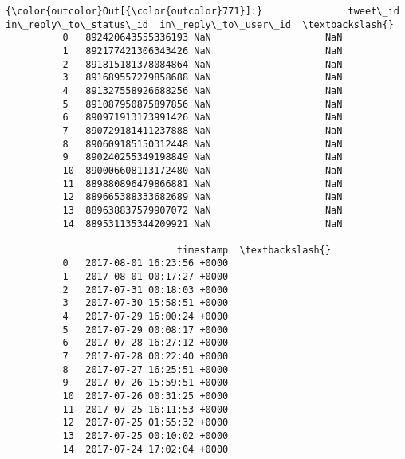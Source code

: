 \documentclass[11pt]{article}
\begin{document}
\begin{Verbatim}[commandchars=\\\{\}]
{\color{outcolor}Out[{\color{outcolor}771}]:}               tweet\_id  in\_reply\_to\_status\_id  in\_reply\_to\_user\_id  \textbackslash{}
          0   892420643555336193 NaN                    NaN                    
          1   892177421306343426 NaN                    NaN                    
          2   891815181378084864 NaN                    NaN                    
          3   891689557279858688 NaN                    NaN                    
          4   891327558926688256 NaN                    NaN                    
          5   891087950875897856 NaN                    NaN                    
          6   890971913173991426 NaN                    NaN                    
          7   890729181411237888 NaN                    NaN                    
          8   890609185150312448 NaN                    NaN                    
          9   890240255349198849 NaN                    NaN                    
          10  890006608113172480 NaN                    NaN                    
          11  889880896479866881 NaN                    NaN                    
          12  889665388333682689 NaN                    NaN                    
          13  889638837579907072 NaN                    NaN                    
          14  889531135344209921 NaN                    NaN                    
          
                              timestamp  \textbackslash{}
          0   2017-08-01 16:23:56 +0000   
          1   2017-08-01 00:17:27 +0000   
          2   2017-07-31 00:18:03 +0000   
          3   2017-07-30 15:58:51 +0000   
          4   2017-07-29 16:00:24 +0000   
          5   2017-07-29 00:08:17 +0000   
          6   2017-07-28 16:27:12 +0000   
          7   2017-07-28 00:22:40 +0000   
          8   2017-07-27 16:25:51 +0000   
          9   2017-07-26 15:59:51 +0000   
          10  2017-07-26 00:31:25 +0000   
          11  2017-07-25 16:11:53 +0000   
          12  2017-07-25 01:55:32 +0000   
          13  2017-07-25 00:10:02 +0000   
          14  2017-07-24 17:02:04 +0000   
          

\end{Verbatim}
\end{document}
